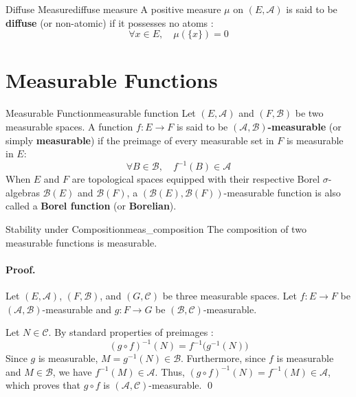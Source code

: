 \begin{definition}{Diffuse Measure}{diffuse measure}
A positive measure $\mu$ on $(E, \mathcal{A})$ is said to be \textbf{diffuse} (or non-atomic) if it possesses no atoms :
\[
    \forall x \in E, \quad \mu(\{x\}) = 0
\]
\end{definition}

\section{Measurable Functions}

\vspace{1em}

\begin{definition}{Measurable Function}{measurable function}
Let $(E, \mathcal{A})$ and $(F, \mathcal{B})$ be two measurable spaces. A function $f : E \to F$ is said to be \textbf{$(\mathcal{A}, \mathcal{B})$-measurable} (or simply \textbf{measurable}) if the preimage of every measurable set in $F$ is measurable in $E$:
\[
    \forall B \in \mathcal{B}, \quad f^{-1}(B) \in \mathcal{A}
\]
When $E$ and $F$ are topological spaces equipped with their respective Borel $\sigma$-algebras $\mathcal{B}(E)$ and $\mathcal{B}(F)$, a $(\mathcal{B}(E), \mathcal{B}(F))$-measurable function is also called a \textbf{Borel function} (or \textbf{Borelian}).
\end{definition}


\begin{proposition}{Stability under Composition}{meas_composition}
The composition of two measurable functions is measurable.
\end{proposition}

\paragraph{Proof.}
Let $(E, \mathcal{A})$, $(F, \mathcal{B})$, and $(G, \mathcal{C})$ be three measurable spaces.
Let $f : E \to F$ be $(\mathcal{A}, \mathcal{B})$-measurable and $g : F \to G$ be $(\mathcal{B}, \mathcal{C})$-measurable.

Let $N \in \mathcal{C}$. By standard properties of preimages :
\[
    (g \circ f)^{-1}(N) = f^{-1}\big(g^{-1}(N)\big)
\]
Since $g$ is measurable, $M = g^{-1}(N) \in \mathcal{B}$.
Furthermore, since $f$ is measurable and $M \in \mathcal{B}$, we have $f^{-1}(M) \in \mathcal{A}$.
Thus, $(g \circ f)^{-1}(N) = f^{-1}(M) \in \mathcal{A}$, which proves that $g \circ f$ is $(\mathcal{A}, \mathcal{C})$-measurable. \qed

